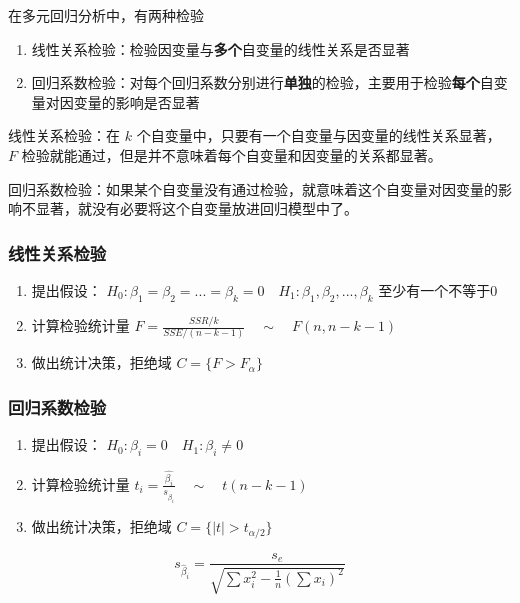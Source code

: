 \documentclass[UTF8,10pt]{book}
\begin{document}
在多元回归分析中，有两种检验

\begin{enumerate}
	\def\labelenumi{\arabic{enumi}.}
	\item
	线性关系检验：检验因变量与\textbf{多个}自变量的线性关系是否显著
	\item
	回归系数检验：对每个回归系数分别进行\textbf{单独}的检验，主要用于检验\textbf{每个}自变量对因变量的影响是否显著
\end{enumerate}

{\kaishu
线性关系检验：在 \(k\)
个自变量中，只要有一个自变量与因变量的线性关系显著， \(F\)
检验就能通过，但是并不意味着每个自变量和因变量的关系都显著。

回归系数检验：如果某个自变量没有通过检验，就意味着这个自变量对因变量的影响不显著，就没有必要将这个自变量放进回归模型中了。
}

\subsubsection{线性关系检验}\label{header-n238}

\begin{enumerate}
	\def\labelenumi{\arabic{enumi}.}
	\item
	提出假设：
	\(H_0 : \beta_1 = \beta_2 = ... = \beta_k = 0  \quad H_1 : \beta_1 , \beta_2 , ... , \beta_k\)
	至少有一个不等于0
	\item
	计算检验统计量
	\(F = \frac{SSR/k}{SSE/(n-k-1)} \quad \sim \quad F(n,n-k-1)\) 
	\item
	做出统计决策，拒绝域 \( C = \{ F>F_{\alpha} \} \)
\end{enumerate}

\subsubsection{回归系数检验}\label{header-n246}

\begin{enumerate}
	\def\labelenumi{\arabic{enumi}.}
	\item
	提出假设： \(H_0 : \beta_i = 0  \quad H_1 : \beta_i \neq 0\) 
	\item
	计算检验统计量
	\(t_i = \frac{\hat{\beta_i}}{s_{\hat{\beta_i}}} \quad \sim \quad t(n-k-1)\)
	\item
	做出统计决策，拒绝域 \( C = \{ |t|>t_{\alpha / 2} \} \)
\end{enumerate}

\[s_{\hat{\beta}_i} = \frac{s_e}{\sqrt{\sum x_i^2 - \frac{1}{n}\left(\sum x_i\right)^2}}\]
\end{document}
